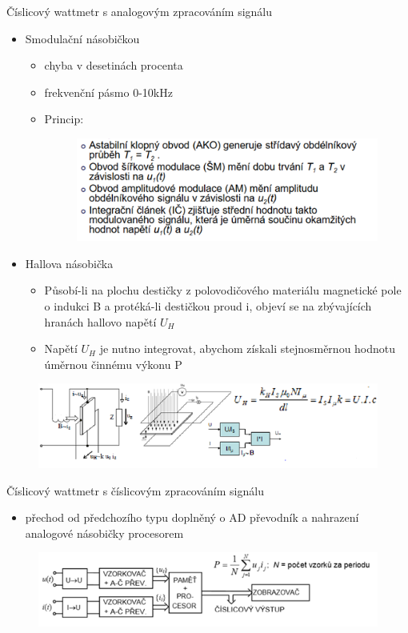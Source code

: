 Číslicový wattmetr s analogovým zpracováním signálu
\begin{itemize}
    \item Smodulační násobičkou
          \begin{itemize}
              \item chyba v desetinách procenta
              \item frekvenční pásmo 0-10kHz
              \item Princip:
                    \begin{figure}[H]
                        \includegraphics*[scale  = 1]{images/wattAnalogPrincip.png}
                    \end{figure}
          \end{itemize}
          \newpage

    \item Hallova násobička
          \begin{itemize}
              \item Působí-li na plochu destičky z polovodičového materiálu magnetické pole o indukci B a protéká-li destičkou proud i, objeví se na zbývajících hranách hallovo napětí $U_H$
              \item Napětí $U_H$ je nutno integrovat, abychom získali stejnosměrnou hodnotu úměrnou činnému výkonu P
          \end{itemize}
\end{itemize}
\begin{figure}[H]
    \includegraphics*[scale  = 1.3]{images/wattHallovaNasobicka.png}
\end{figure}

Číslicový wattmetr s číslicovým zpracováním signálu
\begin{itemize}
    \item přechod od předchozího typu doplněný o AD převodník a nahrazení analogové násobičky procesorem
\end{itemize}
\begin{figure}[H]
    \includegraphics*[scale  = 1.3]{images/wattCislicovySchema.png}
\end{figure}

